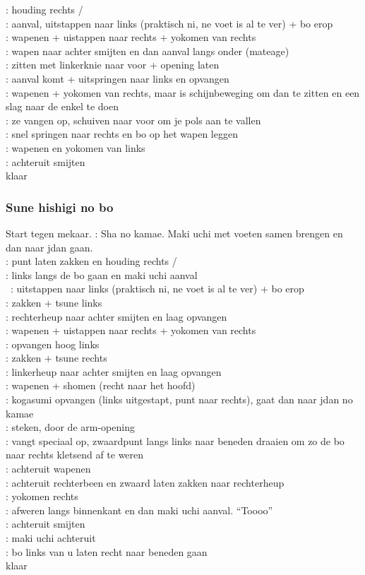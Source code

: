 \pB: houding rechts /\\
\pB: aanval, uitstappen naar links (praktisch ni, ne voet is al te ver) + bo erop\\
\pB: wapenen + uistappen naar rechts + yokomen van rechts\\
\pB: wapen naar achter smijten en dan aanval langs onder (mateage)\\
\pB: zitten met linkerknie naar voor + opening laten\\
\pB: aanval komt + uitspringen naar links en opvangen\\
\pB: wapenen + yokomen van rechts, maar is schijnbeweging om dan te zitten en een slag naar de enkel te doen\\
\pA: ze vangen op, schuiven naar voor om je pols aan te vallen\\
\pB: snel springen naar rechts en bo op het wapen leggen\\
\pB: wapenen en yokomen van links\\
\pB: achteruit smijten\\
klaar

\subsubsection{Sune hishigi no bo}

Start tegen mekaar.
\pA: Sha no kamae. Maki uchi met voeten samen brengen en dan naar jdan gaan.\\
\pB: punt laten zakken en houding rechts /\\
\pA: links langs de bo gaan en maki uchi aanval\\\
\pB: uitstappen naar links (praktisch ni, ne voet is al te ver) + bo erop\\
\pB: zakken + tsune links\\
\pA: rechterheup naar achter smijten en laag opvangen\\
\pB: wapenen + uistappen naar rechts + yokomen van rechts\\
\pA: opvangen hoog links\\
\pB: zakken + tsune rechts\\
\pA: linkerheup naar achter smijten en laag opvangen\\
\pB: wapenen + shomen (recht naar het hoofd)\\
\pA: kogasumi opvangen (links uitgestapt, punt naar rechts), gaat dan naar jdan no kamae\\
\pB: steken, door de arm-opening\\
\pA: vangt speciaal op, zwaardpunt langs links naar beneden draaien om zo de bo naar rechts kletsend af te weren\\
\pB: achteruit wapenen\\
\pA: achteruit rechterbeen en zwaard laten zakken naar rechterheup\\
\pB: yokomen rechts\\
\pA: afweren langs binnenkant en dan maki uchi aanval. ``Toooo''\\
\pB: achteruit smijten\\
\pA: maki uchi achteruit\\
\pB: bo links van u laten recht naar beneden gaan\\
klaar

